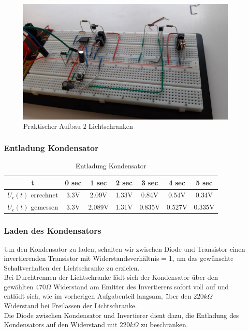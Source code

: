 \begin{figure}[htb]
    \includegraphics[width=14cm]{./res/Kondensator_Lichtschranke_2}
    \caption{Praktischer Aufbau 2 Lichtschranken}
    \label{fig:KondensatorLadungLichtschrankeAufbau2}
\end{figure}

\newpage
\subsubsection{Entladung Kondensator}


\begin{table}[htb]
\centering
\caption{Entladung Kondensator}
\label{KondensatorRechnung}
\begin{tabular}{c|cccccc}
\toprule
t & 0 sec & 1 sec & 2 sec & 3 sec & 4 sec & 5 sec \\
\midrule
$U_{c}(t)$ errechnet & 3.3V & 2.09V & 1.33V & 0.84V & 0.54V & 0.34V \\
$U_{c}(t)$ gemessen & 3.3V & 2.089V & 1.31V & 0.835V & 0.527V & 0.335V \\
\bottomrule
\end{tabular}
\end{table}

\subsubsection{Laden des Kondensators}

Um den Kondensator zu laden, schalten wir zwischen Diode und Transistor einen invertierenden Transistor mit Widerstandsverhältnis = 1, um das gewünschte Schaltverhalten der Lichtschranke zu erzielen.\\
Bei Durchtrennen der Lichtschranke lädt sich der Kondensator über den gewählten $470 \Omega$ Widerstand am Emitter des Invertierers sofort voll auf und entlädt sich, wie im vorherigen Aufgabenteil langsam, über den $220 k \Omega$ Widerstand bei Freilassen der Lichtschranke.\\
Die Diode zwischen Kondensator und Invertierer dient dazu, die Entladung des Kondensators auf den Widerstand mit $220 k \Omega$ zu beschränken.

